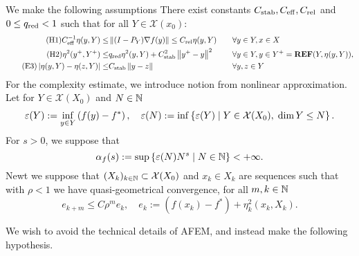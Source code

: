 \documentclass[12pt,english]{article}
\begin{document}
We make the following assumptions 
There exist constants $C_{\rm stab},C_{\rm eff},C_{\rm rel}$ and $0\le q_{\rm red}<1$ such that for all $Y\in \mathcal X(x_0)$: 
%
\begin{align}
\label{hyp:estimator:reliability}\tag{H1}
\Ceff^{-1} \eta(y,Y) \le& \norm{(I-P_Y)\nabla f(y)}\le \Crel \eta(y,Y)&\quad&\forall y\in Y, x\in X\\
\label{hyp:estimator:reduction}\tag{H2}
%
\eta^2(y^+, Y^+)\le& \qred \eta^2(y,Y) + \Cstab^2\norm{y^+-y}^2&\quad&\forall y\in Y, y\in Y^+=\REF(Y, \eta(y,Y)),\\
\label{hyp:estimator:stability}\tag{E3}
\abs{\eta(y, Y)-\eta(z, Y)}\le& \Cstab \norm{y-z}&\quad&\forall y,z\in Y
%
\end{align}
%
%
For the complexity estimate, we introduce  notion from nonlinear approximation. 
Let for $Y\in\mathcal X(X_0)$ and $N\in\mathbb N$
%
\begin{align*}
\varepsilon(Y):=\inf_{y\in Y}\left(f(y)-f^*\right),\quad \varepsilon(N) := \inf\left\{\varepsilon(Y)\;\middle|\;Y\in \mathcal X(X_0),\; \dim Y \le N\right\}.
\end{align*}
%
For $s>0$, we suppose that
%
\begin{equation}\label{eq:property2}
\alpha_f(s):= \sup\left\{\varepsilon(N) N^s\;\middle|\;N\in\mathbb N\right\} < +\infty.
\end{equation}
%
Newt we suppose that $(X_k)_{k\in\mathbb N}\subset\mathcal X(X_0)$ and $x_k\in X_k$ are sequences such that with 
$\rho<1$ we have quasi-geometrical convergence, for all $m,k\in \mathbb N$
%
\begin{equation}\label{eq:property3}
e_{k+m} \le C \rho^{m}e_k,\quad e_k:= \left(f(x_k)-f^*\right) + \eta_k^2(x_k,X_k).
\end{equation}
%

We wish to avoid the technical details of AFEM, and instead make the following hypothesis. 
\end{document}
